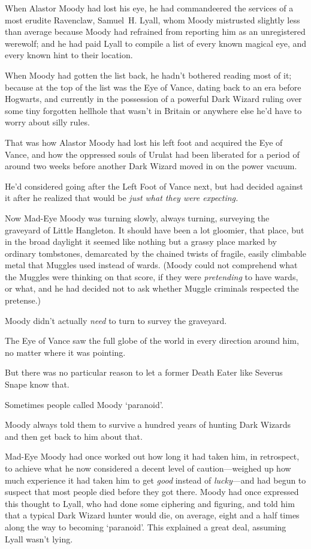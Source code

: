 When Alastor Moody had lost his eye, he had commandeered the services of a most
erudite Ravenclaw, Samuel~H. Lyall, whom Moody mistrusted slightly less than
average because Moody had refrained from reporting him as an unregistered
werewolf; and he had paid Lyall to compile a list of every known magical eye,
and every known hint to their location.

When Moody had gotten the list back, he hadn't bothered reading most of it;
because at the top of the list was the Eye of Vance, dating back to an era
before Hogwarts, and currently in the possession of a powerful Dark Wizard
ruling over some tiny forgotten hellhole that wasn't in Britain or anywhere
else he'd have to worry about silly rules.

That was how Alastor Moody had lost his left foot and acquired the Eye of
Vance, and how the oppressed souls of Urulat had been liberated for a period of
around two weeks before another Dark Wizard moved in on the power vacuum.

He'd considered going after the Left Foot of Vance next, but had decided
against it after he realized that would be \emph{just what they were expecting.}

Now Mad-Eye Moody was turning slowly, always turning, surveying the graveyard
of Little Hangleton. It should have been a lot gloomier, that place, but in the
broad daylight it seemed like nothing but a grassy place marked by ordinary
tombstones, demarcated by the chained twists of fragile, easily climbable metal
that Muggles used instead of wards. (Moody could not comprehend what the
Muggles were thinking on that score, if they were \emph{pretending} to have
wards, or what, and he had decided not to ask whether Muggle criminals
respected the pretense.)

Moody didn't actually \emph{need} to turn to survey the graveyard.

The Eye of Vance saw the full globe of the world in every direction around him,
no matter where it was pointing.

But there was no particular reason to let a former Death Eater like Severus
Snape know that.

Sometimes people called Moody `paranoid'.

Moody always told them to survive a hundred years of hunting Dark Wizards and
then get back to him about that.

Mad-Eye Moody had once worked out how long it had taken him, in retrospect, to
achieve what he now considered a decent level of caution—weighed up how much
experience it had taken him to get \emph{good} instead of \emph{lucky}—and
had begun to suspect that most people died before they got there. Moody had
once expressed this thought to Lyall, who had done some ciphering and figuring,
and told him that a typical Dark Wizard hunter would die, on average, eight and
a half times along the way to becoming `paranoid'. This explained a great deal,
assuming Lyall wasn't lying.

